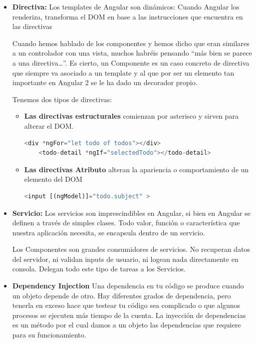 \begin{itemize}
\item \textbf{Directiva:} Los templates de Angular son dinámicos: Cuando Angular los renderiza, transforma el DOM en base a las instrucciones que encuentra en las directivas

Cuando hemos hablado de los componentes y hemos dicho que eran similares a un controlador con una vista, muchos habréis pensando “más bien se parece a una directiva…”. Es cierto, un Componente es un caso concreto de directiva que siempre va asociado a un template y al que por ser un elemento tan importante en Angular 2 se le ha dado un decorador propio.

Tenemos dos tipos de directivas:
\begin{itemize}
\item \textbf{Las directivas estructurales} comienzan por asterisco y sirven para alterar el DOM.
\begin{lstlisting}[language=javascript] 
   <div *ngFor="let todo of todos"></div>
    <todo-detail *ngIf="selectedTodo"></todo-detail>
\end{lstlisting}
\item \textbf{Las directivas Atributo} alteran la apariencia o comportamiento de un elemento del DOM

\begin{lstlisting}[language=javascript] 
   <input [(ngModel)]="todo.subject" >
\end{lstlisting}

\end{itemize}
\item \textbf{Servicio: }Los servicios son imprescindibles en Angular, si bien en Angular se definen a través de simples clases. Todo valor, función o característica que nuestra aplicación necesita, se encapsula dentro de un servicio.

Los Componentes son grandes consumidores de servicios. No recuperan datos del servidor, ni validan inputs de usuario, ni logean nada directamente en consola. Delegan todo este tipo de tareas a los Servicios.

\item \textbf{Dependency Injection}  Una dependencia en tu código se produce cuando un objeto depende de otro. Hay diferentes grados de dependencia, pero tenerla en exceso hace que testear tu código sea complicado o que algunos procesos se ejecuten más tiempo de la cuenta.
La inyección de dependencias es un método por el cual damos a un objeto las dependencias que requiere para su funcionamiento. 
\end{itemize}

